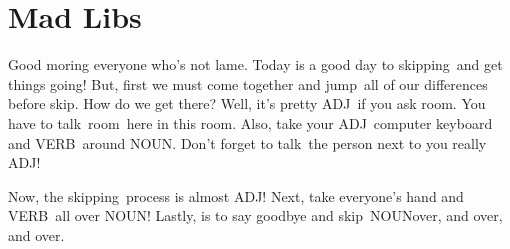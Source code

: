 \documentclass[]{article}
\newcommand{\verbOne}{skipping}
\newcommand{\verbTwo}{jump}
\newcommand{\verbThree}{skip}
\newcommand{\verbFour}{talk}
\newcommand{\verbFive}{VERB}
\newcommand{\verbSix}{VERB}
\newcommand{\nounTwo}{room}
\newcommand{\nounThree}{NOUN}
\newcommand{\nounFour}{NOUN}
\newcommand{\nounFive}{NOUN}
\newcommand{\adjOne}{lame}
\newcommand{\adjTwo}{ADJ}
\newcommand{\adjThree}{ADJ}
\newcommand{\adjFive}{ADJ}
\begin{document}
\section{Mad Libs}

Good moring everyone who's not \adjOne.
Today is a good day to \verbOne~and get things going!
But, first we must come together and \verbTwo~all of our differences before \verbThree.
How do we get there?
Well, it's pretty \adjTwo~if you ask \nounTwo.
You have to \verbFour~\nounTwo~here in this room.
Also, take your \adjFive~computer keyboard and \verbFive~around \nounThree.
Don't forget to \verbFour~the person next to you really \adjThree!

Now, the \verbOne~process is almost \adjTwo!
Next, take everyone's hand and \verbSix~all over \nounFour!
Lastly, is to say goodbye and \verbThree~\nounFive over, and over, and over.
\end{document}
